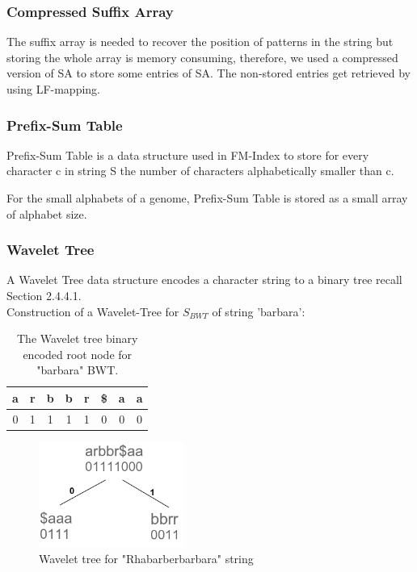 \documentclass[11pt,a4paper]{report}
\begin{document}
\subsubsection{Compressed Suffix Array} \label{Compressed Suffix Array}
The suffix array is needed to recover the position of patterns in the string
but storing the whole array is memory consuming, therefore, we used a
compressed version of SA to store some entries of SA.
The non-stored entries get retrieved by using LF-mapping.

\subsubsection{Prefix-Sum Table} \label{Prefix-Sum Table}
Prefix-Sum Table is a data structure used in FM-Index to store for every 
character c in string S the number of characters alphabetically smaller than c.

For the small alphabets of a genome, Prefix-Sum Table is stored
as a small array of alphabet size.

\subsubsection{Wavelet Tree}  \label{Wavelet Tree}
A Wavelet Tree data structure encodes a character string to a
binary tree recall Section 2.4.4.1.\\

Construction of a Wavelet-Tree for $ S_{BWT} $ of string 'barbara':

\begin{table}[h]
\centering
  \begin{tabular}{ c c c c c c c c}
   a  & r & b & b & r & \$ & a & a \\ 
  \hline
   0 &	1 &	1 & 1 & 1 & 0 & 0 & 0\\  
  \hline
  \end{tabular}
\caption{The Wavelet tree binary encoded root node for "barbara" BWT.}
\label{wavlet-binary-barbara}
\end{table}


\begin{figure}[H]
\centering
\includegraphics[width=4.75cm]{pictures/WavletBarbara.png}
\caption{Wavelet tree for "Rhabarberbarbara" string }
\label{Wavlet-barbara}
\end{figure}
\end{document}
